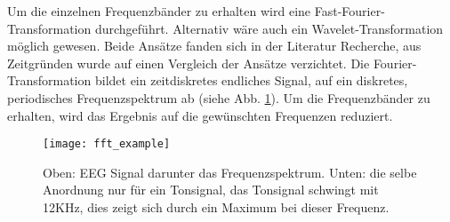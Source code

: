 Um die einzelnen Frequenzbänder zu erhalten wird eine Fast-Fourier-Transformation \cite{Bochner_1} durchgeführt. Alternativ wäre auch ein Wavelet-Transformation \cite{Chui:1992:IW:163196} möglich gewesen. Beide Ansätze fanden sich in der Literatur Recherche, aus Zeitgründen wurde auf einen Vergleich der Ansätze verzichtet. 
Die Fourier-Transformation bildet ein zeitdiskretes endliches Signal, auf ein diskretes, periodisches Frequenzspektrum ab (siehe Abb. \ref{fig:fft_example}). Um die Frequenzbänder zu erhalten, wird das Ergebnis auf die gewünschten Frequenzen reduziert.

\begin{figure}[h] 
  \begin{center}
    \texttt{[image: fft\_example]}
    \caption[Fast Fourier Transformation]{Oben: EEG Signal darunter das Frequenzspektrum. Unten: die selbe Anordnung nur für ein Tonsignal, das Tonsignal schwingt mit 12KHz, dies zeigt sich durch ein Maximum bei dieser Frequenz. \label{fig:fft_example}}
  \end{center}
\end{figure}

